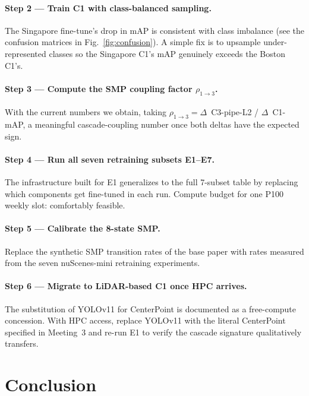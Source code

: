 \documentclass[11pt,a4paper]{article}
\begin{document}
\paragraph{Step 2 --- Train C1 with class-balanced sampling.} The
Singapore fine-tune's drop in mAP is consistent with class imbalance
(see the confusion matrices in Fig.~\ref{fig:confusion}). A simple
fix is to upsample under-represented classes so the Singapore C1's
mAP genuinely exceeds the Boston C1's.

\paragraph{Step 3 --- Compute the SMP coupling factor $\rho_{1\to3}$.}
With the current numbers we obtain, taking
$\rho_{1\to3} = \Delta$~C3-pipe-L2 / $\Delta$~C1-mAP, a meaningful
cascade-coupling number once both deltas have the expected sign.

\paragraph{Step 4 --- Run all seven retraining subsets E1--E7.} The
infrastructure built for E1 generalizes to the full 7-subset table by
replacing which components get fine-tuned in each run. Compute budget
for one P100 weekly slot: comfortably feasible.

\paragraph{Step 5 --- Calibrate the 8-state SMP.} Replace the
synthetic SMP transition rates of the base paper with rates measured
from the seven nuScenes-mini retraining experiments.

\paragraph{Step 6 --- Migrate to LiDAR-based C1 once HPC arrives.} The
substitution of YOLOv11 for CenterPoint is documented as a free-compute
concession. With HPC access, replace YOLOv11 with the literal
CenterPoint specified in Meeting~3 and re-run E1 to verify the
cascade signature qualitatively transfers.

\section{Conclusion}
\end{document}
